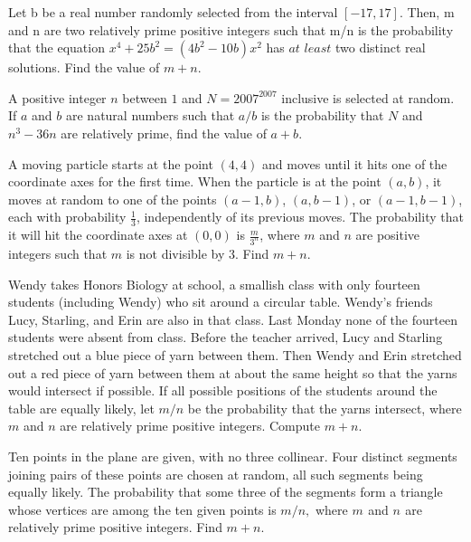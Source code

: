 \documentclass[11pt]{scrartcl}
\begin{document}
\begin{soaljawab} [iTest 2007]
    Let b be a real number randomly selected from the interval $[-17,17]$. Then, m and n are two relatively prime positive integers such that m/n is the probability that the equation $x^4+25b^2=(4b^2-10b)x^2$ has $\textit{at least}$ two distinct real solutions. Find the value of $m+n$.
\end{soaljawab}

\begin{soaljawab} [iTest 2007]
    A positive integer $n$ between $1$ and $N=2007^{2007}$ inclusive is selected at random. If $a$ and $b$ are natural numbers such that $a/b$ is the probability that $N$ and $n^3-36n$ are relatively prime, find the value of $a+b$.
\end{soaljawab}

\begin{soaljawab} [AIME 2019]
    A moving particle starts at the point $(4,4)$ and moves until it hits one of the coordinate axes for the first time. When the particle is at the point $(a,b)$, it moves at random to one of the points $(a-1,b)$, $(a,b-1)$, or $(a-1,b-1)$, each with probability $\frac{1}{3}$, independently of its previous moves. The probability that it will hit the coordinate axes at $(0,0)$ is $\frac{m}{3^n}$, where $m$ and $n$ are positive integers such that $m$ is not divisible by $3$. Find $m + n$.
\end{soaljawab}

\begin{soaljawab} [iTest 2008]
    Wendy takes Honors Biology at school, a smallish class with only fourteen students (including Wendy) who sit around a circular table. Wendy’s friends Lucy, Starling, and Erin are also in that class. Last Monday none of the fourteen students were absent from class. Before the teacher arrived, Lucy and Starling stretched out a blue piece of yarn between them. Then Wendy and Erin stretched out a red piece of yarn between them at about the same height so that the yarns would intersect if possible. If all possible positions of the students around the table are equally likely, let $m/n$ be the probability that the yarns intersect, where $m$ and $n$ are relatively prime positive integers. Compute $m + n$.
\end{soaljawab}

\begin{soaljawab}[AIME 1999]
    Ten points in the plane are given, with no three collinear. Four distinct segments joining pairs of these points are chosen at random, all such segments being equally likely. The probability that some three of the segments form a triangle whose vertices are among the ten given points is $m/n,$ where $m_{}$ and $n_{}$ are relatively prime positive integers. Find $m+n.$
\end{soaljawab}
\end{document}
